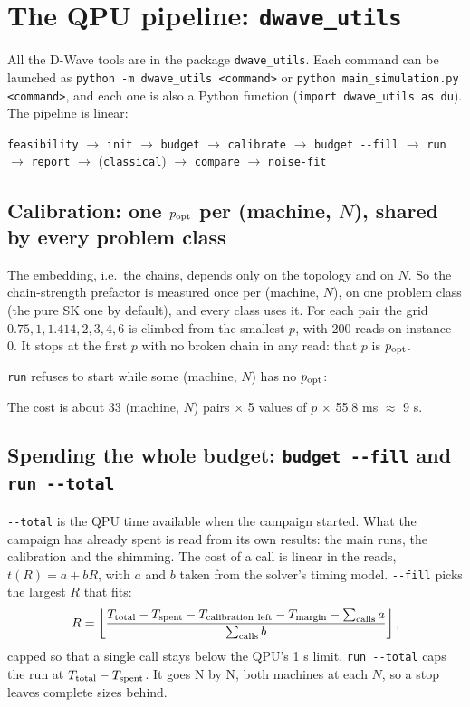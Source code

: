 \documentclass[11pt,a4paper]{article}
\newcommand{\code}[1]{\nolinkurl{#1}}
\newcommand{\src}[4]{}
\begin{document}
\section{The QPU pipeline: \texorpdfstring{\code{dwave_utils}}{dwave\_utils}}\label{sec:pipeline}
All the D-Wave tools are in the package \code{dwave_utils}. Each command can be launched as
\code{python -m dwave_utils <command>} or \code{python main_simulation.py <command>}, and each one is also a Python
function (\code{import dwave_utils as du}). The pipeline is linear:
\begin{center}
\code{feasibility} $\to$ \code{init} $\to$ \code{budget} $\to$ \code{calibrate} $\to$ \code{budget --fill} $\to$
\code{run} $\to$ \code{report} $\to$ (\code{classical}) $\to$ \code{compare} $\to$ \code{noise-fit}
\end{center}

\subsection{Calibration: one $p_{\rm opt}$ per (machine, $N$), shared by every problem class}
The embedding, i.e.\ the chains, depends only on the topology and on $N$. So the chain-strength prefactor is
measured once per (machine, $N$), on one problem class (the pure SK one by default), and every class uses it.
For each pair the grid $0.75, 1, 1.414, 2, 3, 4, 6$ is climbed from the smallest $p$, with 200 reads on instance 0.
It stops at the first $p$ with no broken chain in any read: that $p$ is $p_{\rm opt}$.
\src{dwave_utils/pipeline.py}{\rCalibA}{\rCalibB}{one calibration per (machine, $N$)}
\code{run} refuses to start while some (machine, $N$) has no $p_{\rm opt}$:
\src{dwave_utils/pipeline.py}{\rMissingA}{\rMissingB}{what is still uncalibrated}
\src{dwave_utils/coupling_scan.py}{\rPreforA}{\rPreforB}{the $p$ used by every QPU call}
The cost is about 33 (machine, $N$) pairs $\times$ 5 values of $p$ $\times$ 55.8 ms $\approx$ 9 s.

\subsection{Spending the whole budget: \texorpdfstring{\code{budget --fill}}{budget --fill} and \texorpdfstring{\code{run --total}}{run --total}}
\code{--total} is the QPU time available when the campaign started. What the campaign has already spent is read
from its own results: the main runs, the calibration and the shimming. The cost of a call is linear in the reads,
$t(R)=a+bR$, with $a$ and $b$ taken from the solver's timing model. \code{--fill} picks the largest $R$ that fits:
\[
R=\left\lfloor\frac{T_{\rm total}-T_{\rm spent}-T_{\rm calibration\ left}-T_{\rm margin}-\sum_{\rm calls}a}{\sum_{\rm calls}b}\right\rfloor,
\]
capped so that a single call stays below the QPU's 1 s limit. \code{run --total} caps the run at
$T_{\rm total}-T_{\rm spent}$. It goes N by N, both machines at each $N$, so a stop leaves complete sizes behind.
\end{document}
